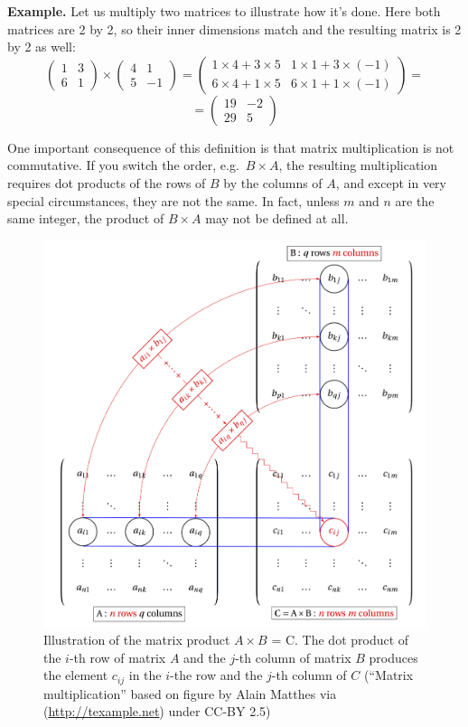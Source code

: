 \documentclass[
]{book}
\theoremstyle{definition}
\theoremstyle{definition}
\theoremstyle{definition}
\theoremstyle{remark}
\begin{document}
\textbf{Example.} Let us multiply two matrices to illustrate how it's done. Here both matrices are 2 by 2, so their inner dimensions match and the resulting matrix is 2 by 2 as well:
\[ 
\left(\begin{array}{cc}1 & 3 \\ 6 & 1\end{array}\right) \times \left(\begin{array}{cc}4 & 1 \\5 & -1 \end{array}\right) = \left(\begin{array}{cc}1 \times 4 + 3 \times 5 & 1 \times 1 +3 \times (-1) \\ 6 \times 4+ 1 \times 5 & 6 \times 1+1 \times (-1) \end{array}\right) = \]
\[= \left(\begin{array}{cc}19 & -2 \\ 29 & 5 \end{array}\right) 
\]

One important consequence of this definition is that matrix multiplication is not commutative. If you switch the order, e.g.~\(B \times A\), the resulting multiplication requires dot products of the rows of \(B\) by the columns of \(A\), and except in very special circumstances, they are not the same. In fact, unless \(m\) and \(n\) are the same integer, the product of \(B \times A\) may not be defined at all.

\begin{figure}
\centering
\includegraphics{ch11/matrix_multiplication_tikz.png}
\caption{Illustration of the matrix product \(A \times B\) = C. The dot product of the \(i\)-th row of matrix \(A\) and the \(j\)-th column of matrix \(B\) produces the element \(c_{ij}\) in the \(i\)-the row and the \(j\)-th column of \(C\) (``Matrix multiplication'' based on figure by Alain Matthes via (\url{http://texample.net}) under CC-BY 2.5)}
\end{figure}
\end{document}
